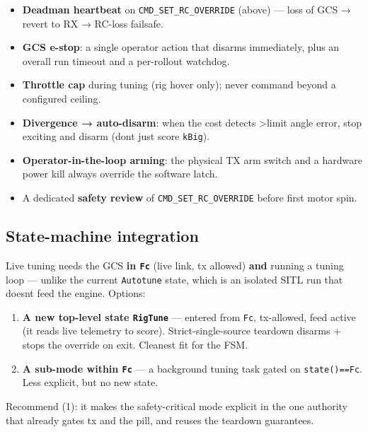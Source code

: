 \documentclass[
  11pt,
]{article}
\providecommand{\tightlist}{%
  \setlength{\itemsep}{0pt}\setlength{\parskip}{0pt}}
\begin{document}
\begin{itemize}
\tightlist
\item
  \textbf{Deadman heartbeat} on \texttt{CMD\_SET\_RC\_OVERRIDE} (above)
  --- loss of GCS → revert to RX → RC-loss failsafe.
\item
  \textbf{GCS e-stop}: a single operator action that disarms
  immediately, plus an overall run timeout and a per-rollout watchdog.
\item
  \textbf{Throttle cap} during tuning (rig hover only); never command
  beyond a configured ceiling.
\item
  \textbf{Divergence → auto-disarm}: when the cost detects
  \textgreater limit angle error, stop exciting and disarm
  (don\textquotesingle t just score \texttt{kBig}).
\item
  \textbf{Operator-in-the-loop arming}: the physical TX arm switch and a
  hardware power kill always override the software latch.
\item
  A dedicated \textbf{safety review} of \texttt{CMD\_SET\_RC\_OVERRIDE}
  before first motor spin.
\end{itemize}

\hypertarget{state-machine-integration}{%
\subsection{State-machine integration}\label{state-machine-integration}}

Live tuning needs the GCS \textbf{in \texttt{Fc}} (live link, tx
allowed) \textbf{and} running a tuning loop --- unlike the current
\texttt{Autotune} state, which is an isolated SITL run that
doesn\textquotesingle t feed the engine. Options:

\begin{enumerate}
\def\labelenumi{\arabic{enumi}.}
\tightlist
\item
  \textbf{A new top-level state \texttt{RigTune}} --- entered from
  \texttt{Fc}, tx-allowed, feed active (it reads live telemetry to
  score). Strict-single-source teardown disarms + stops the override on
  exit. Cleanest fit for the FSM.
\item
  \textbf{A sub-mode within \texttt{Fc}} --- a background tuning task
  gated on \texttt{state()==Fc}. Less explicit, but no new state.
\end{enumerate}

Recommend (1): it makes the safety-critical mode explicit in the one
authority that already gates tx and the pill, and reuses the teardown
guarantees.
\end{document}
